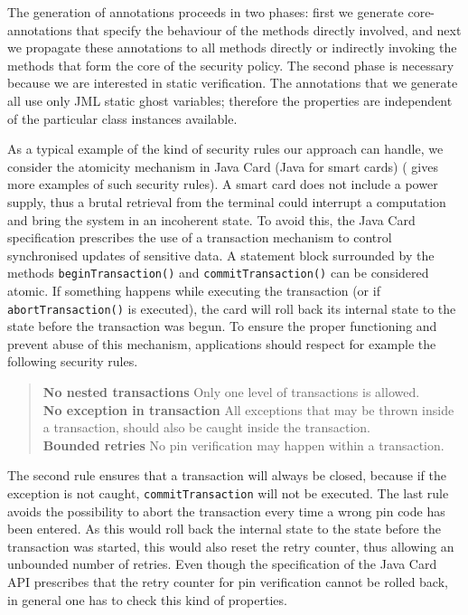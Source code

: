 The generation of annotations proceeds in two phases: first we
generate core-annotations that specify the behaviour of the methods
directly involved, and next we propagate these annotations to all
methods directly or indirectly invoking the methods that form the core
of the security policy. The second phase is necessary because we are
interested in static verification. The annotations that we generate
all use only JML static ghost variables; therefore the properties are
independent of the particular class instances available. 

As a typical example of the kind of security rules our approach can
handle, we consider the atomicity mechanism in Java Card (Java for
smart cards) (\cite{PavlovaBBHL04} gives more examples of such
security rules). A smart card does not include a power supply, thus a
brutal retrieval from the terminal could interrupt a computation and
bring the system in an incoherent state. To avoid this, the Java Card
specification prescribes the use of a transaction mechanism to control
synchronised updates of sensitive data. A statement block surrounded
by the methods \texttt{beginTransaction()} and
\texttt{commitTransaction()} can be considered atomic.
If something happens while executing the transaction (or if
\texttt{abortTransaction()} is executed), the card will
roll back its internal state to the state before the transaction was
begun. To ensure the proper functioning and prevent abuse of this
mechanism, applications should respect for example the following
security rules. 

\begin{quote}
\textbf{No nested transactions} Only one level of transactions
is allowed.\smallskip\\
\textbf{No exception in transaction} All exceptions that may be thrown
inside a transaction, should also be caught inside the
transaction.\smallskip\\
\textbf{Bounded retries}
No pin verification may happen within a transaction.
\end{quote} 
The second rule ensures that a transaction will always be closed,
because if the exception is not caught, \texttt{commitTransaction}
will not be executed. The last rule avoids the possibility to abort
the transaction every time a wrong pin code has been entered. As this
would roll back the internal state to the state before the transaction
was started, this would also reset the retry counter, thus allowing an
unbounded number of retries. Even though the specification of the Java
Card API prescribes that the retry counter for pin verification cannot
be rolled back, in general one has to check this kind of properties.

